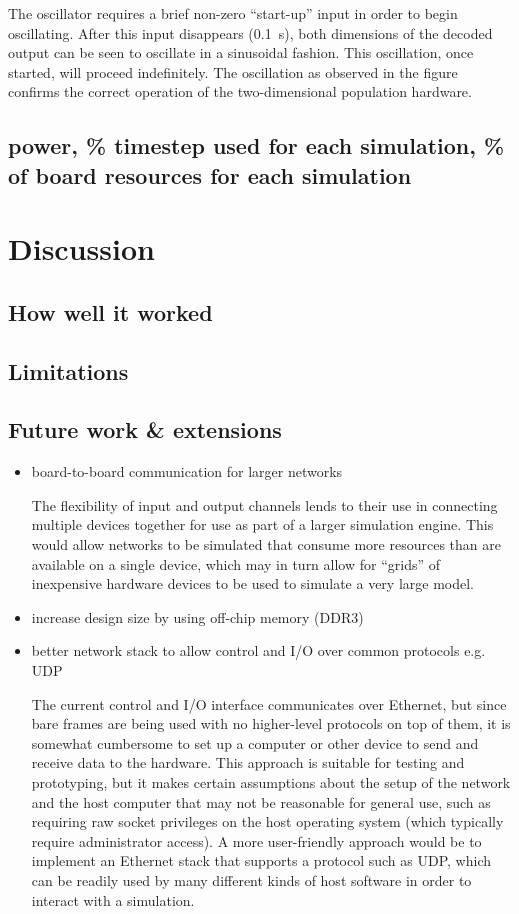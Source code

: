 \documentclass[english]{article}
\begin{document}
The oscillator requires a brief non-zero ``start-up'' input in order to begin oscillating.
After this input disappears (0.1~s), both dimensions of the decoded output can be seen to
oscillate in a sinusoidal fashion. This oscillation, once started, will proceed indefinitely.
The oscillation as observed in the figure confirms the correct operation of the two-dimensional
population hardware.

\subsection{power, \% timestep used for each simulation, \% of board resources for each simulation}

\section{Discussion}

\subsection{How well it worked}

\subsection{Limitations}

\subsection{Future work \& extensions}

\begin{itemize}
\item board-to-board communication for larger networks

The flexibility of input and output channels lends to their use in connecting multiple devices together for use as part of a larger simulation engine.
This would allow networks to be simulated that consume more resources than are available on a single device, which may in turn allow
for ``grids'' of inexpensive hardware devices to be used to simulate a very large model.
\item increase design size by using off-chip memory (DDR3)
\item better network stack to allow control and I/O over common protocols e.g. UDP

The current control and I/O interface communicates over Ethernet, but since bare frames are being used with no higher-level protocols on top of them,
it is somewhat cumbersome to set up a computer or other device to send and receive data to the hardware.
This approach is suitable for testing and prototyping, but it makes certain assumptions about the setup of the network and the host computer that
may not be reasonable for general use, such as requiring raw socket privileges on the host operating system (which typically require administrator access).
A more user-friendly approach would be to implement an Ethernet stack that supports a protocol such as UDP, which can be readily used by many different
kinds of host software in order to interact with a simulation.
\end{itemize}
\end{document}
